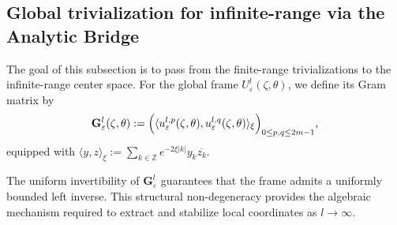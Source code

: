 \documentclass[reqno,11pt]{amsart}
\newcommand{\Z}{{\mathbb Z}}
\begin{document}
\subsection{Global trivialization for infinite-range via the Analytic Bridge }

The goal of this subsection is to pass from the finite-range trivializations to the infinite-range center space.  For the global frame $U_{\varepsilon}^{l}(\zeta,\theta)$, we define its Gram matrix by
\begin{equation*}\label{eq:Gram-matrix}
\mathbf{G}^{l}_{\varepsilon}(\zeta,\theta) := \Bigl( \langle u^{l,p}_{\varepsilon}(\zeta,\theta), u^{l,q}_{\varepsilon}(\zeta,\theta) \rangle_\xi \Bigr)_{0\le p,q\le 2m-1},
\end{equation*}
equipped with  $\langle y,z\rangle_\xi := \sum_{k\in\Z} e^{-2\xi|k|}y_k\overline{z_k}$. 

The uniform invertibility of $\mathbf{G}^{l}_{\varepsilon}$  guarantees that the frame admits a uniformly bounded left inverse. This structural non-degeneracy provides the  algebraic mechanism required to extract and stabilize local coordinates as $l \to \infty$.
\end{document}
